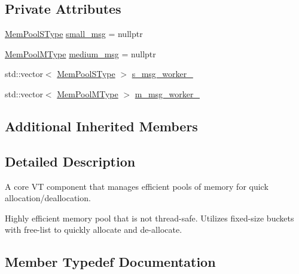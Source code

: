 \subsection*{Private Attributes}
\begin{DoxyCompactItemize}
\item 
\hyperlink{structvt_1_1pool_1_1_pool_a9f94985824d12c43357cfe50eaaefd38}{Mem\+Pool\+S\+Type} \hyperlink{structvt_1_1pool_1_1_pool_a8f14f2f9b344882cf727200eb8d41845}{small\+\_\+msg} = nullptr
\item 
\hyperlink{structvt_1_1pool_1_1_pool_a8a201b9a843e47cd4e7b568a8e4483da}{Mem\+Pool\+M\+Type} \hyperlink{structvt_1_1pool_1_1_pool_a268cb9b30cde3272c49e67e781f0345e}{medium\+\_\+msg} = nullptr
\item 
std\+::vector$<$ \hyperlink{structvt_1_1pool_1_1_pool_a9f94985824d12c43357cfe50eaaefd38}{Mem\+Pool\+S\+Type} $>$ \hyperlink{structvt_1_1pool_1_1_pool_a9551faed42cf337990287481e158b01e}{s\+\_\+msg\+\_\+worker\+\_\+}
\item 
std\+::vector$<$ \hyperlink{structvt_1_1pool_1_1_pool_a8a201b9a843e47cd4e7b568a8e4483da}{Mem\+Pool\+M\+Type} $>$ \hyperlink{structvt_1_1pool_1_1_pool_a86b8d7208cd3e42c821e23f0ab654d26}{m\+\_\+msg\+\_\+worker\+\_\+}
\end{DoxyCompactItemize}
\subsection*{Additional Inherited Members}


\subsection{Detailed Description}
A core VT component that manages efficient pools of memory for quick allocation/deallocation. 

Highly efficient memory pool that is not thread-\/safe. Utilizes fixed-\/size buckets with free-\/list to quickly allocate and de-\/allocate. 

\subsection{Member Typedef Documentation}
\mbox{\label{structvt_1_1pool_1_1_pool_acc5ad2d64bf6ff58fead958a69c12d74}} 
